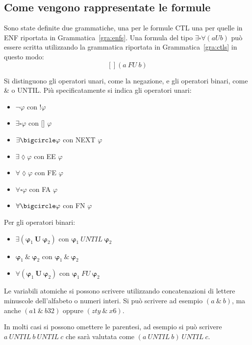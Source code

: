 \documentclass[a4paper, 10pt]{article}
\numberwithin{equation}{theor}
\begin{document}
\subsection{Come vengono rappresentate le formule}
Sono state definite due grammatiche, una per le formule \ac{CTL} una per quelle in \ac{ENF} riportata in Grammatica~\ref{gra:enfs}.
Una formula del tipo $\exists \square \forall(a U b) $ può essere scritta utilizzando la grammatica riportata in Grammatica~\ref{gra:ctls} in questo modo:
$$ [] (a \ FU \ b) $$

Si distinguono gli operatori unari, come la negazione, e gli operatori binari, come \& o UNTIL.
Più specificatamente si indica gli operatori unari:
\begin{itemize}
  \item $ \neg \varphi $ con !$\varphi $
  \item $ \exists \square \varphi$ con [] $\varphi $
  \item $ \exists \bigcircle \varphi$ con NEXT $\varphi $
  \item $ \exists \lozenge \varphi$ con EE $\varphi $
  \item $ \forall \lozenge \varphi$ con FE $\varphi $
  \item $ \forall \square \varphi$ con FA $\varphi $
  \item $ \forall \bigcircle \varphi$ con FN $\varphi $
\end{itemize}
Per gli operatori binari:
\begin{itemize}
  \item $ \exists (\boldsymbol{\varphi}_{1} \ \boldsymbol{U} \ \boldsymbol{\varphi}_{2})$ con $ \boldsymbol{\varphi}_{1} \ UNTIL \ \boldsymbol{\varphi}_{2}$
  \item $ \boldsymbol{\varphi}_{1} \ \& \ \boldsymbol{\varphi}_{2}$ con $ \boldsymbol{\varphi}_{1} \ \& \ \boldsymbol{\varphi}_{2}$
  \item $ \forall (\boldsymbol{\varphi}_{1} \ \boldsymbol{U} \ \boldsymbol{\varphi}_{2})$ con $ \boldsymbol{\varphi}_{1} \ FU \ \boldsymbol{\varphi}_{2}$
\end{itemize}
Le variabili atomiche si possono scrivere utilizzando concatenazioni di lettere minuscole dell'alfabeto o numeri interi.
Si può scrivere ad esempio $(a \ \& \ b)$, ma anche $(a1 \ \& \ b32) $ oppure $ (zty \ \& \ x6)$.

In molti casi si possono omettere le parentesi, ad esempio si può scrivere $ a \ UNTIL \ b \ UNTIL \ c$ che sarà valutata come $ (a \ UNTIL \ b) \ UNTIL \ c$.
\end{document}
